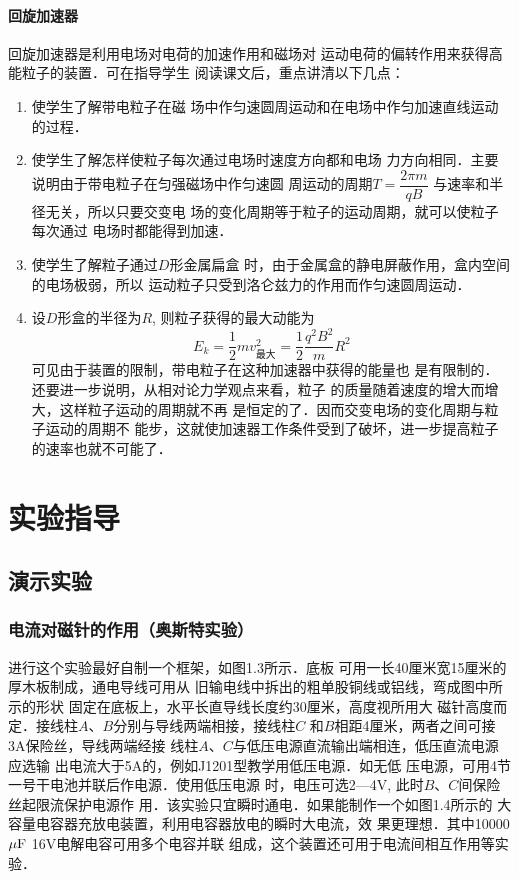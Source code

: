 \paragraph{回旋加速器}
回旋加速器是利用电场对电荷的加速作用和磁场对
运动电荷的偏转作用来获得高能粒子的装置．可在指导学生
阅读课文后，重点讲清以下几点：
\begin{enumerate}
    \item 使学生了解带电粒子在磁
场中作匀速圆周运动和在电场中作匀加速直线运动的过程．
\item 使学生了解怎样使粒子每次通过电场时速度方向都和电场
力方向相同．主要说明由于带电粒子在匀强磁场中作匀速圆
周运动的周期$T=\dfrac{2\pi m}{qB}$
与速率和半径无关，所以只要交变电
场的变化周期等于粒子的运动周期，就可以使粒子每次通过
电场时都能得到加速．
\item 使学生了解粒子通过$D$形金属扁盒
时，由于金属盒的静电屏蔽作用，盒内空间的电场极弱，所以
运动粒子只受到洛仑兹力的作用而作匀速圆周运动．
\item 设$D$形盒的半径为$R$, 则粒子获得的最大动能为
\[E_k=\frac{1}{2}mv^2_{\text{最大}}=\frac{1}{2}\frac{q^2B^2}{m}R^2\]
可见由于装置的限制，带电粒子在这种加速器中获得的能量也
是有限制的．还要进一步说明，从相对论力学观点来看，粒子
的质量随着速度的增大而增大，这样粒子运动的周期就不再
是恒定的了．因而交变电场的变化周期与粒子运动的周期不
能步，这就使加速器工作条件受到了破坏，进一步提高粒子
的速率也就不可能了．
\end{enumerate}

\section{实验指导}
\subsection{演示实验}
\subsubsection{电流对磁针的作用（奥斯特实验）}



进行这个实验最好自制一个框架，如图1.3所示．底板
可用一长40厘米宽15厘米的厚木板制成，通电导线可用从
旧输电线中拆出的粗单股铜线或铝线，弯成图中所示的形状
固定在底板上，水平长直导线长度约30厘米，高度视所用大
磁针高度而定．接线柱$A$、$B$分别与导线两端相接，接线柱$C$
和$B$相距4厘米，两者之间可接3A保险丝，导线两端经接
线柱$A$、$C$与低压电源直流输出端相连，低压直流电源应选输
出电流大于5A的，例如J1201型教学用低压电源．如无低
压电源，可用4节一号干电池并联后作电源．使用低压电源
时，电压可选2—4V, 此时$B$、$C$间保险丝起限流保护电源作
用．该实验只宜瞬时通电．如果能制作一个如图1.4所示的
大容量电容器充放电装置，利用电容器放电的瞬时大电流，效
果更理想．其中10000 $\mu{\rm F}$ 16V电解电容可用多个电容并联
组成，这个装置还可用于电流间相互作用等实验．

